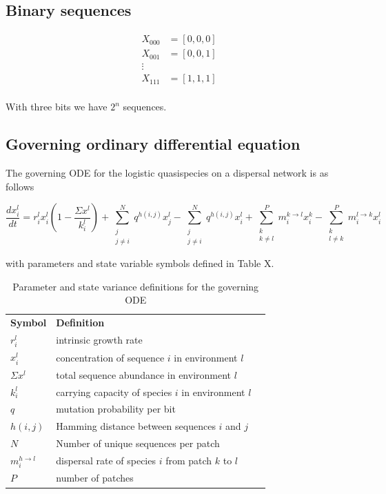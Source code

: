 \documentclass[12pt]{article}
\begin{document}
\subsection*{Binary sequences}
\begin{align*}
X_{000} &= [0,0,0]\\
X_{001} &= [0,0,1]\\
\vdots \\
X_{111} &= [1,1,1]\\
\end{align*}

With three bits we have $2^n$ sequences.


\subsection*{Governing ordinary differential equation}

The governing ODE for the logistic quasispecies on a dispersal network is as follows 

\[ \frac{dx_{i}^{l}}{dt} = r_i^l x_i^l\left(1 - \frac{\Sigma x^l}{k_i^l}\right) 
		 + \sum_{\substack{j\\j \neq i}}^N q^{h(i,j)}x_j^l
		 - \sum_{\substack{j\\j \neq i}}^N q^{h(i,j)}x_i^l
		 + \sum_{\substack{k\\k \neq l}}^{P}m_{i}^{k \rightarrow l}x_{i}^{k}		
		 -  \sum_{\substack{k\\l \neq k}}^{P}m_{i}^{l \rightarrow k} x_{i}^{l} \] 

with parameters and state variable symbols defined in Table X. 

\begin{table}[!h]
\centering
   \caption{Parameter and state variance definitions for the governing ODE} 
\begin{tabular}{lll}
 \textbf{Symbol} &  \textbf{Definition}  \\
 $r_i^l$           & intrinsic growth rate  \\
 $x_i^l$          & concentration of sequence $i$ in environment $l$  \\
 $\Sigma x^l $ & total sequence abundance in environment $l$  \\
 $k_i^l$      & carrying capacity of species $i$ in environment $l$ \\ 
 $q$            & mutation probability  per bit\\
 $h(i,j)$           & Hamming distance between sequences $i$ and $j$\\
 $N$               & Number of unique sequences per patch \\
 $m_i^{h\rightarrow l}$ & dispersal rate of species $i$ from patch $k$ to $l$\\
 $P$  & number of patches 
\end{tabular}
\end{table}
\end{document}

